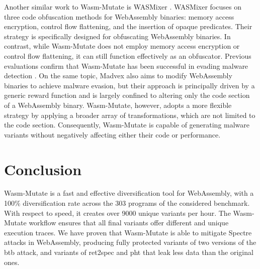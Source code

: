 \documentclass[a4paper,fleqn]{cas-dc}
\newcommand*\badge[1]{ \colorbox{red}{\color{white}#1}}
\newcommand{\tool}{{\sc Wasm-Mutate}\xspace}
\newcommand{\Wasm}{WebAssembly\xspace}
\newcommand{\wasm}{\Wasm}
\newcommand{\todo}[1]{%
\refstepcounter{todo}
\noindent\textbf{\badge{TODO}} {\color{red}#1}
\addcontentsline{td}{todo}
{\color{red}\thesection.\thetodo\xspace #1}}
\begin{document}
Another similar work to \tool is WASMixer \cite{wasmixer}.
WASMixer focuses on three code obfuscation methods for WebAssembly  binaries: memory access encryption, control flow flattening, and the insertion of opaque predicates. 
Their strategy is specifically designed for obfuscating WebAssembly binaries. 
In contrast, while \tool does not employ memory access encryption or control flow flattening, it can still function effectively as an obfuscator. 
Previous evaluations confirm that \tool has been successful in evading malware detection \cite{CABRERAARTEAGA2023103296}.
On the same topic, Madvex \cite{madvex} also aims to modify WebAssembly binaries to achieve malware evasion, but their approach is principally driven by a generic reward function and is largely confined to altering only the code section of a WebAssembly binary. 
\tool, however, adopts a more flexible strategy by applying a broader array of transformations, which are not limited to the code section. 
Consequently, \tool is capable of generating malware variants without negatively affecting either their code or performance.


\section{Conclusion}
\label{conc}

\tool is a fast and effective diversification tool for \wasm, with a 100\% diversification rate across the 303 programs of the considered benchmark. 
With respect to speed, it creates over 9000 unique variants per hour.
The \tool workflow ensures that all final variants offer different and unique execution traces. 
We have proven that \tool is able to mitigate Spectre attacks in \wasm, producing fully protected variants of two versions of the btb attack, and variants of ret2spec and pht that leak less data than the original ones.
\end{document}
